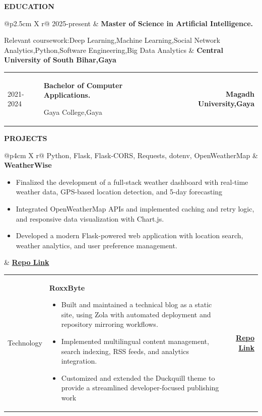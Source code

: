 \documentclass[8pt,a4paper]{article}
\makeatletter
\newlength{\sectiontitlewidth}
\newcommand{\cvsection}[1]{%
	\noindent\settowidth{\sectiontitlewidth}{\textbf{\large\MakeUppercase{#1}}}%
	\textbf{\large\MakeUppercase{#1}}\ \raisebox{0.5ex}{\rule{\dimexpr\linewidth-\sectiontitlewidth-1em}{1pt}}%
	\vspace{0.5em}%
}
\newcommand{\educationentry}[4]{%
	\noindent
	\begin{tabularx}{\linewidth}{@{}p{2.5cm} X r@{}}
		#1 & \textbf{#2} \par\vspace{2pt} \small #3 & \textbf{#4} \\
	\end{tabularx}%
	\vspace{2px}
}
\newcommand{\projectentry}[4]{%
	\noindent
	\begin{tabularx}{\linewidth}{@{}p{4cm} X r@{}}
		#1 & \textbf{#2} \par\vspace{2pt} \small #3 & \textbf{#4} \\
	\end{tabularx}%
	\vspace{0.8em}%
}
\makeatother
\begin{document}
	
	\cvsection{Education}
	
	\educationentry
	{2025-present} %
	{Master of Science in Artificial Intelligence.} %
	{Relevant coursework:Deep Learning,Machine Learning,Social Network Analytics,Python,Software Engineering,Big Data Analytics} %
	{Central University of South Bihar,Gaya} %
	
	
	\educationentry
	{2021-2024} %
	{Bachelor of Computer Applications.} %
	{Gaya College,Gaya} %
	{Magadh University,Gaya} %
	
	
	
	
	\cvsection{Projects}
	
	\projectentry
	{Python, Flask, Flask-CORS, Requests, dotenv, OpenWeatherMap} %
	{WeatherWise} %
	{\begin{itemize}
			\item Finalized the development of a full-stack weather dashboard with real-time weather data, GPS-based location detection, and 5-day
			forecasting
			\item Integrated OpenWeatherMap APIs and implemented caching and retry logic, and responsive data visualization with
			Chart.js.
			\item Developed a modern Flask-powered web application with location search, weather analytics, and user
			preference management.
	\end{itemize}} %
	{\href{https://github.com/roxxadiiii/weatherwise}{Repo Link}} %
	\projectentry
	{Technology} %
	{RoxxByte} %
	{\begin{itemize}
			\item Built and maintained a technical blog as a static site, using Zola with automated deployment and repository mirroring
			workflows.
			\item Implemented multilingual content management, search indexing, RSS feeds, and analytics integration.
			\item Customized and extended the Duckquill theme to provide a streamlined developer-focused publishing work
	\end{itemize}} %
	{\href{https://github.com/roxxadiiii/roxxbyte}{Repo Link}} %
	
\end{document}
